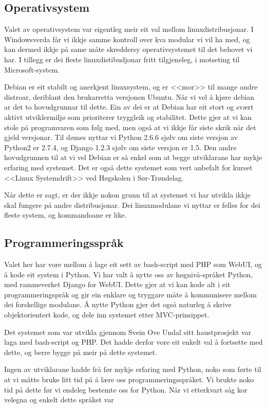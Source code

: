 \documentclass[nynorsk,12pt,a4paper,oneside]{book}
\begin{document}
\subsection{Operativsystem}
Valet av operativsystem var eigentleg meir eit val mellom linuxdistribusjonar. I Windowsverda får vi ikkje samme kontroll over kva modular vi vil ha med, og kan dermed ikkje på same måte skreddersy operativsystemet til det behovet vi har. I tillegg er dei fleste linuxdistibudjonar fritt tilgjeneleg, i motseting til Microsoft-system. 

Debian er eit stabilt og anerkjent linuxsystem, og er <<mor>> til mange andre distroar, deriblant den brukarretta versjonen Ubuntu. Når vi vel å kjøre debian ar det to hovudgrunnar til dette. Ein av dei er at Debian har eit stort og svært aktivt utviklermiljø som prioriterer tryggleik og stabilitet. Dette gjer at vi kan stole på programvaren som følg med, men også at vi ikkje får siste skrik når det gjeld versjonar. Til dømes nyttar vi Python 2.6.6 sjølv om siste versjon av Python2 er 2.7.4, og Django 1.2.3 sjølv om siste versjon er 1.5. 
Den andre hovudgrunnen til at vi vel Debian er så enkel som at begge utviklarane har mykje erfaring med systemet. Det er også dette systemet som vert anbefalt for kurset <<Linux Systemdrift>> ved Høgskolen i Sør-Trøndelag.

Når dette er sagt, er der ikkje nokon grunn til at systemet vi har utvikla ikkje skal fungere på andre distribusjonar. Dei linuxmodulane vi nyttar er felles for dei fleste system, og kommandoane er like. 

\subsection{Programmeringsspråk}
Valet her har vore mellom å lage eit sett av bash-script med PHP som WebUI, og å kode eit system i Python. Vi har valt å nytte oss av høgnivå-språket Python, med rammeverket Django for WebUI. Dette gjer at vi kan kode alt i eit programmeringspråk og gir ein enklare og tryggare måte å kommunisere mellom dei forskellige modulane. Å nytte Python gjer det også naturleg å skrive objektorientert kode, og dele inn systemet etter MVC-prinsippet. 

Det systemet som var utvikla gjennom Svein Ove Undal sitt haustprosjekt var laga med bash-script og PHP. Det hadde derfor vore eit enkelt val å fortsette med dette, og berre bygge på meir på dette systemet. 

Ingen av utviklarane hadde frå før mykje erfaring med Python, noko som førte til at vi måtte bruke litt tid på å lære oss programmeringsspråket. Vi brukte noko tid på dette før vi endeleg bestemte oss for Python. Når vi etterkvart såg kor velegna og enkelt dette språket var
\end{document}
